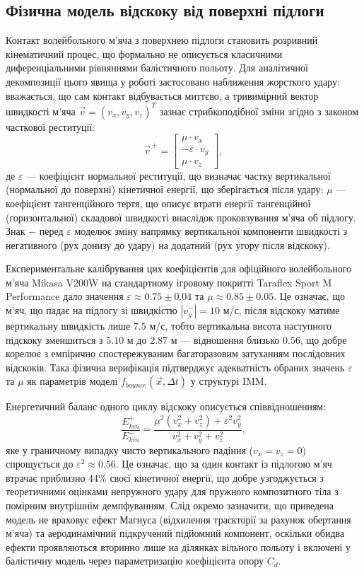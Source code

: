 \subsection{Фізична модель відскоку від поверхні підлоги}

Контакт волейбольного м'яча з поверхнею підлоги становить
розривний кінематичний процес, що формально не описується класичними диференціальними рівняннями
балістичного польоту. Для аналітичної декомпозиції цього явища у роботі застосовано наближення
жорсткого удару: вважається, що сам контакт відбувається миттєво, а тривимірний вектор
швидкості м'яча $\vec{v} = (v_x, v_y, v_z)^T$ зазнає стрибкоподібної зміни згідно з законом
часткової реституції:
\begin{equation}\vec{v}^{\,+} = \begin{bmatrix} \mu \cdot v_x \\ -\varepsilon \cdot v_y \\ \mu \cdot v_z \end{bmatrix},\end{equation}
де $\varepsilon$ --- коефіцієнт нормальної реституції, що визначає частку
вертикальної (нормальної до поверхні) кінетичної енергії, що зберігається після удару;
$\mu$ --- коефіцієнт тангенційного тертя, що описує втрати енергії
тангенційної (горизонтальної) складової швидкості внаслідок проковзування м'яча об підлогу.
Знак $-$ перед $\varepsilon$ моделює зміну напрямку вертикальної компоненти швидкості з
негативного (рух донизу до удару) на додатний (рух угору після відскоку).

Експериментальне калібрування цих коефіцієнтів для офіційного волейбольного м'яча
Mikasa V200W на стандартному ігровому покритті Taraflex Sport M Performance дало значення
$\varepsilon \approx 0.75 \pm 0.04$ та $\mu \approx 0.85 \pm 0.05$. Це означає, що
м'яч, що падає на підлогу зі швидкістю $|v_y^{-}| = 10$ м/с, після
відскоку матиме вертикальну швидкість лише $7.5$ м/с, тобто вертикальна
висота наступного підскоку зменшиться з $5.10$ м до $2.87$ м --- відношення близько $0.56$,
що добре корелює з емпірично спостережуваним багаторазовим затуханням послідовних
відскоків. Така фізична верифікація підтверджує адекватність обраних значень $\varepsilon$
та $\mu$ як параметрів моделі $f_{bounce}(\vec{x}, \Delta t)$ у структурі \gls{IMM}.

Енергетичний баланс одного циклу відскоку
описується співвідношенням:
\begin{equation}\frac{E_{kin}^{+}}{E_{kin}^{-}} = \frac{\mu^2 (v_x^2 + v_z^2) + \varepsilon^2 v_y^2}{v_x^2 + v_y^2 + v_z^2},\end{equation}
яке у граничному випадку чисто вертикального падіння ($v_x = v_z = 0$) спрощується до
$\varepsilon^2 \approx 0.56$. Це означає, що за один контакт із підлогою м'яч втрачає
приблизно 44\% своєї кінетичної енергії, що добре узгоджується з теоретичними оцінками
непружного удару для пружного композитного тіла з помірним внутрішнім демпфуванням.
Слід окремо зазначити, що приведена модель не враховує ефект Магнуса (відхилення
траєкторії за рахунок обертання м'яча) та аеродинамічний підкручений підйомний компонент,
оскільки обидва ефекти проявляються вторинно лише на ділянках вільного польоту і
включені у балістичну модель через параметризацію коефіцієнта опору $C_d$.

